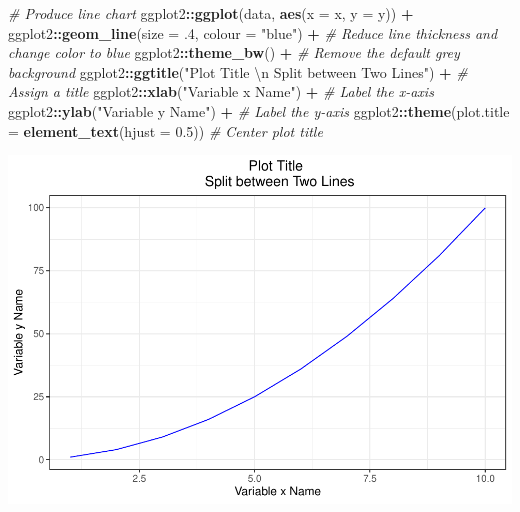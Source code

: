 \documentclass[]{book}
\newenvironment{Shaded}{\begin{snugshade}}{\end{snugshade}}
\newcommand{\CharTok}[1]{\textcolor[rgb]{0.31,0.60,0.02}{#1}}
\newcommand{\CommentTok}[1]{\textcolor[rgb]{0.56,0.35,0.01}{\textit{#1}}}
\newcommand{\DataTypeTok}[1]{\textcolor[rgb]{0.13,0.29,0.53}{#1}}
\newcommand{\FloatTok}[1]{\textcolor[rgb]{0.00,0.00,0.81}{#1}}
\newcommand{\KeywordTok}[1]{\textcolor[rgb]{0.13,0.29,0.53}{\textbf{#1}}}
\newcommand{\NormalTok}[1]{#1}
\newcommand{\OperatorTok}[1]{\textcolor[rgb]{0.81,0.36,0.00}{\textbf{#1}}}
\newcommand{\StringTok}[1]{\textcolor[rgb]{0.31,0.60,0.02}{#1}}
\begin{document}
\begin{Shaded}
\begin{Highlighting}[]
\CommentTok{# Produce line chart}
\NormalTok{ggplot2}\OperatorTok{::}\KeywordTok{ggplot}\NormalTok{(data, }\KeywordTok{aes}\NormalTok{(}\DataTypeTok{x =}\NormalTok{ x, }\DataTypeTok{y =}\NormalTok{ y)) }\OperatorTok{+}
\NormalTok{ggplot2}\OperatorTok{::}\KeywordTok{geom_line}\NormalTok{(}\DataTypeTok{size =} \FloatTok{.4}\NormalTok{, }\DataTypeTok{colour =} \StringTok{"blue"}\NormalTok{) }\OperatorTok{+}\StringTok{ }\CommentTok{# Reduce line thickness and change color to blue}
\NormalTok{ggplot2}\OperatorTok{::}\KeywordTok{theme_bw}\NormalTok{() }\OperatorTok{+}\StringTok{ }\CommentTok{# Remove the default grey background}
\NormalTok{ggplot2}\OperatorTok{::}\KeywordTok{ggtitle}\NormalTok{(}\StringTok{"Plot Title }\CharTok{\textbackslash{}n}\StringTok{ Split between Two Lines"}\NormalTok{) }\OperatorTok{+}\StringTok{ }\CommentTok{# Assign a title}
\NormalTok{ggplot2}\OperatorTok{::}\KeywordTok{xlab}\NormalTok{(}\StringTok{"Variable x Name"}\NormalTok{) }\OperatorTok{+}\StringTok{ }\CommentTok{# Label the x-axis}
\NormalTok{ggplot2}\OperatorTok{::}\KeywordTok{ylab}\NormalTok{(}\StringTok{"Variable y Name"}\NormalTok{) }\OperatorTok{+}\StringTok{ }\CommentTok{# Label the y-axis}
\NormalTok{ggplot2}\OperatorTok{::}\KeywordTok{theme}\NormalTok{(}\DataTypeTok{plot.title =} \KeywordTok{element_text}\NormalTok{(}\DataTypeTok{hjust =} \FloatTok{0.5}\NormalTok{)) }\CommentTok{# Center plot title}
\end{Highlighting}
\end{Shaded}

\includegraphics{People_Analytics_Lifecycle_files/figure-latex/unnamed-chunk-52-1.pdf}
\end{document}
